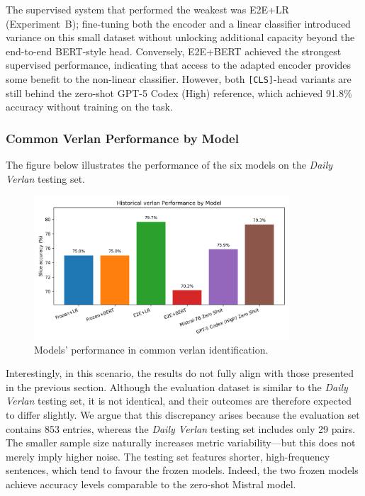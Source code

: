 \documentclass[12pt]{article}
\begin{document}
The supervised system that performed the weakest was E2E+LR (Experiment~B); fine-tuning both the encoder and a linear classifier introduced variance on this small dataset without unlocking additional capacity beyond the end-to-end BERT-style head. Conversely, E2E+BERT achieved the strongest supervised performance, indicating that access to the adapted encoder provides some benefit to the non-linear classifier. However, both \texttt{[CLS]}-head variants are still behind the zero-shot GPT-5 Codex (High) reference, which achieved 91.8\% accuracy without training on the task.

\subsubsection{Common Verlan Performance by Model}

The figure below illustrates the performance of the six models on the \textit{Daily Verlan} testing set.

\begin{figure}[htbp]
    \centering
    \includegraphics[width=0.85\textwidth]{figures/historical_verlan_comparison.png}
    \caption{Models' performance in common verlan identification.}
    \label{fig:historical-verlan-comparison}
\end{figure}

Interestingly, in this scenario, the results do not fully align with those presented in the previous section. 
Although the evaluation dataset is similar to the \textit{Daily Verlan} testing set, it is not identical, and their outcomes are therefore expected to differ slightly. 
We argue that this discrepancy arises because the evaluation set contains 853 entries, whereas the \textit{Daily Verlan} testing set includes only 29 pairs. 
The smaller sample size naturally increases metric variability\;---\;but this does not merely imply higher noise. 
The testing set features shorter, high-frequency sentences, which tend to favour the frozen models. 
Indeed, the two frozen models achieve accuracy levels comparable to the zero-shot Mistral model.
\end{document}
